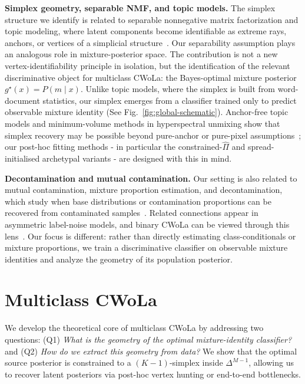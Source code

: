 \documentclass{article}
\theoremstyle{plain}
\theoremstyle{definition}
\theoremstyle{remark}
\begin{document}
\textbf{Simplex geometry, separable NMF, and topic models.}
The simplex structure we identify is related to separable nonnegative matrix factorization and topic modeling, where latent components become identifiable as extreme rays, anchors, or vertices of a simplicial structure~\citep{cutler1994archetypal,Donoho2003:nmf,Arora2011ComputingAN,Arora2012LearningTM,Arora2012APA,Ke2017UsingSF}.
Our separability assumption plays an analogous role in mixture-posterior space.
The contribution is not a new vertex-identifiability principle in isolation, but the identification of the relevant discriminative object for multiclass CWoLa: the Bayes-optimal mixture posterior \(g^\star(x)=P(m\mid x)\).
Unlike topic models, where the simplex is built from word-document statistics, our simplex emerges from a classifier trained only to predict observable mixture identity (See Fig.~\ref{fig:global-schematic}).
Anchor-free topic models and minimum-volume methods in hyperspectral unmixing show that simplex recovery may be possible beyond pure-anchor or pure-pixel assumptions~\citep{Chan2009ASF,BioucasDias2012HyperspectralUO,Huang2016AnchorFreeCT}; our post-hoc fitting methods - in particular the constrained-$\hat\Pi$ and spread-initialised archetypal variants - are designed with this in mind.

\textbf{Decontamination and mutual contamination.}
Our setting is also related to mutual contamination, mixture proportion estimation, and decontamination, which study when base distributions or contamination proportions can be recovered from contaminated samples~\citep{KatzSamuels2017DecontaminationOM,Scott2020LearningFL}.
Related connections appear in asymmetric label-noise models, and binary CWoLa can be viewed through this lens~\citep{Scott2013ClassificationWA,Metodiev:2017vrx}.
Our focus is different: rather than directly estimating class-conditionals or mixture proportions, we train a discriminative classifier on observable mixture identities and analyze the geometry of its population posterior.

\section{Multiclass CWoLa}
\label{sec:methodology}

We develop the theoretical core of multiclass CWoLa by addressing two questions: (Q1) \emph{What is the geometry of the optimal mixture-identity classifier?} and (Q2) \emph{How do we extract this geometry from data?} We show that the optimal source posterior is constrained to a $(K-1)$-simplex inside $\Delta^{M-1}$, allowing us to recover latent posteriors via post-hoc vertex hunting or end-to-end bottlenecks.
\end{document}
